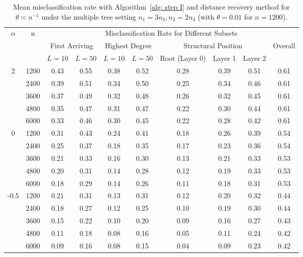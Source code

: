 \begin{table}[tbp]
\setlength{\tabcolsep}{3.5pt}

\centering

{
\begin{tabular}{c|c|cc|cc|ccc|c}
\hline
\hline
\multirow{3}{*}{$\alpha$} & \multirow{3}{*}{n}
& \multicolumn{8}{c}{Misclassification Rate for Different Subsets} \\
\cline{3-10}
& 
& \multicolumn{2}{c|}{First Arriving}
& \multicolumn{2}{c|}{Highest Degree}
& \multicolumn{3}{c|}{Structural Position}
& \multirow{2}{*}{Overall} \\
\cline{3-9}
& 
& $L=10$ & $L=50$
& $L=10$ & $L=50$
& Root (Layer 0) & Layer 1 & Layer 2
& \\
\hline
\multirow{5}{*}{2}
& 1200 & 0.43 & 0.55 & 0.38 & 0.52 & 0.28 & 0.39 & 0.51 & 0.61 \\
& 2400 & 0.39 & 0.51 & 0.34 & 0.50 & 0.25 & 0.34 & 0.46 & 0.61 \\
& 3600 & 0.37 & 0.49 & 0.32 & 0.48 & 0.26 & 0.32 & 0.45 & 0.61 \\
& 4800 & 0.35 & 0.47 & 0.31 & 0.47 & 0.22 & 0.30 & 0.44 & 0.61 \\
& 6000 & 0.33 & 0.46 & 0.30 & 0.45 & 0.22 & 0.28 & 0.42 & 0.61 \\
\hline
\multirow{5}{*}{0}
& 1200 & 0.31 & 0.43 & 0.24 & 0.41 & 0.18 & 0.26 & 0.39 & 0.54 \\
& 2400 & 0.25 & 0.37 & 0.18 & 0.35 & 0.17 & 0.23 & 0.36 & 0.54 \\
& 3600 & 0.21 & 0.33 & 0.16 & 0.30 & 0.13 & 0.21 & 0.33 & 0.53 \\
& 4800 & 0.20 & 0.31 & 0.14 & 0.28 & 0.12 & 0.19 & 0.33 & 0.53 \\
& 6000 & 0.18 & 0.29 & 0.14 & 0.26 & 0.11 & 0.18 & 0.31 & 0.53 \\
\hline
\multirow{5}{*}{-0.5}
& 1200 & 0.21 & 0.31 & 0.13 & 0.31 & 0.12 & 0.20 & 0.32 & 0.44 \\
& 2400 & 0.18 & 0.27 & 0.12 & 0.25 & 0.10 & 0.19 & 0.30 & 0.44 \\
& 3600 & 0.15 & 0.22 & 0.10 & 0.20 & 0.09 & 0.16 & 0.27 & 0.43 \\
& 4800 & 0.11 & 0.18 & 0.08 & 0.16 & 0.05 & 0.11 & 0.24 & 0.42 \\
& 6000 & 0.09 & 0.16 & 0.08 & 0.15 & 0.04 & 0.09 & 0.23 & 0.42 \\
\hline
\hline
\end{tabular}
}


\caption{Mean misclassification rate with Algorithm~\ref{alg: step I} and distance recovery method for $\theta \asymp n^{-1}$ under the multiple tree setting $n_1 = 3 n_3, n_2=2 n_3$ (with $\theta=0.01$ for $n=1200$).}
\label{tab:mean_error_scale_n1 3}
\end{table}